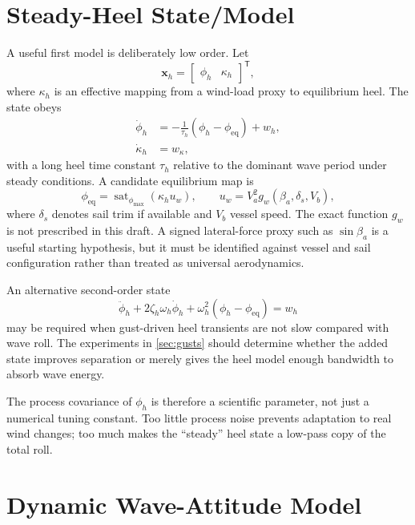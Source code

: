 \documentclass[conference]{IEEEtran}
\DeclareRobustCommand{\vct}[1]{\bm{#1}}
\newcommand{\T}{^{\mathsf T}}
\DeclareMathOperator{\sat}{sat}
\begin{document}
\section{Steady-Heel State/Model}
\label{sec:heel-model}

A useful first model is deliberately low order. Let
\begin{equation}
 \vct x_h=\begin{bmatrix}\phi_h & \kappa_h\end{bmatrix}\T,
 \label{eq:heel-state}
\end{equation}
where $\kappa_h$ is an effective mapping from a wind-load proxy to equilibrium heel. The
state obeys
\begin{align}
 \dot\phi_h &= -\frac{1}{\tau_h}\left(\phi_h-\phi_{\mathrm{eq}}\right)+w_h,\\
 \dot\kappa_h &= w_\kappa,
 \label{eq:heel-dynamics}
\end{align}
with a long heel time constant $\tau_h$ relative to the dominant wave period under
steady conditions. A candidate equilibrium map is
\begin{equation}
 \phi_{\mathrm{eq}}
 = \sat_{\phi_{\max}}\!\left(\kappa_h u_w\right),
 \qquad
 u_w=V_a^2 g_w(\beta_a,\delta_s,V_b),
 \label{eq:heel-equilibrium}
\end{equation}
where $\delta_s$ denotes sail trim if available and $V_b$ vessel speed. The exact function
$g_w$ is not prescribed in this draft. A signed lateral-force proxy such as
$\sin\beta_a$ is a useful starting hypothesis, but it must be identified against vessel
and sail configuration rather than treated as universal aerodynamics.

An alternative second-order state
\begin{equation}
 \ddot\phi_h+2\zeta_h\omega_h\dot\phi_h
 +\omega_h^2(\phi_h-\phi_{\mathrm{eq}})=w_h
 \label{eq:heel-second-order}
\end{equation}
may be required when gust-driven heel transients are not slow compared with wave roll.
The experiments in \cref{sec:gusts} should determine whether the added state improves
separation or merely gives the heel model enough bandwidth to absorb wave energy.

The process covariance of $\phi_h$ is therefore a scientific parameter, not just a
numerical tuning constant. Too little process noise prevents adaptation to real wind
changes; too much makes the ``steady'' heel state a low-pass copy of the total roll.

\section{Dynamic Wave-Attitude Model}
\label{sec:wave-attitude}
\end{document}
